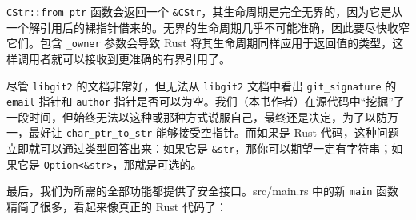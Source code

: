 \texttt{CStr::from\_ptr} 函数会返回一个 \texttt{\&CStr}，其生命周期是完全无界的，因为它是从一个解引用后的裸指针借来的。无界的生命周期几乎不可能准确，因此要尽快收窄它们。包含 \texttt{\_owner} 参数会导致 Rust 将其生命周期同样应用于返回值的类型，这样调用者就可以接收到更准确的有界引用了。

尽管 \texttt{libgit2} 的文档非常好，但无法从 \texttt{libgit2} 文档中看出 \texttt{git\_signature} 的 \texttt{email} 指针和 \texttt{author} 指针是否可以为空。我们（本书作者）在源代码中“挖掘”了一段时间，但始终无法以这种或那种方式说服自己，最终还是决定，为了以防万一，最好让 \texttt{char\_ptr\_to\_str} 能够接受空指针。而如果是 Rust 代码，这种问题立即就可以通过类型回答出来：如果它是 \texttt{\&str}，那你可以期望一定有字符串；如果它是 \texttt{Option<\&str>}，那就是可选的。

最后，我们为所需的全部功能都提供了安全接口。src/main.rs 中的新 \texttt{main} 函数精简了很多，看起来像真正的 Rust 代码了：

